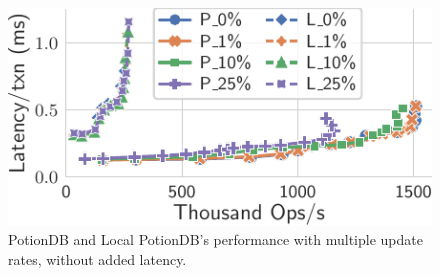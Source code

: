 \documentclass[sigconf, nonacm]{acmart}
\begin{document}
\begin{figure}
	\centering
	\includegraphics[width=0.62\linewidth]{singleQuery/upd_rate_noTC_global_vs_local}
	\vspace*{-0.65em}
	\caption{PotionDB and Local PotionDB's performance with multiple update rates, without added latency.}
	\label{fig:update_rates_global_vs_local_noTC}
	\vspace*{-1.3em}
\end{figure}
\end{document}
